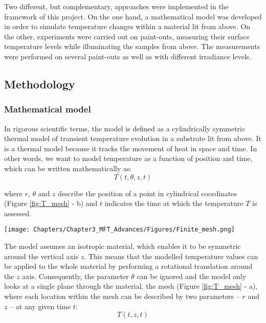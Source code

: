 Two different, but complementary, approaches were implemented in the framework of this project. On the one hand, a mathematical model was developed in order to simulate temperature changes within a material lit from above. On the other, experiments were carried out on paint-outs, measuring their surface temperature levels while illuminating the samples from above. The measurements were performed on several paint-outs as well as with different irradiance levels.\\

\newpage
\subsection{Methodology}

\subsubsection{Mathematical model}

In rigorous scientific terms, the model is defined as a cylindrically symmetric thermal model of transient temperature evolution in a substrate lit from above. It is a thermal model because it tracks the movement of heat in space and time. In other words, we want to model temperature as a function of position and time, which can be written mathematically as: 
$$ T(t,\theta,z,t) $$              

where $r$, $\theta$ and $z$ describe the position of a point in cylindrical coordinates (Figure \ref{fig:T_mesh} - b) and $t$ indicates the time at which the temperature $T$ is assessed. \\

\vspace{0.5cm}

\begin{figure*}[!h]
\centering
\texttt{[image: Chapters/Chapter3\_MFT\_Advances/Figures/Finite\_mesh.png]}
\caption[\hspace{0.3cm}Schematic representation of the thermal model.]{Schematic representation of the cylindrically symmetric thermal model.}
\label{fig:T_mesh}
\end{figure*}

The model assumes an isotropic material, which enables it to be symmetric around the vertical axis $z$. This means that the modelled temperature values can be applied to the whole material by performing a rotational translation around the $z$ axis. Consequently, the parameter $\theta$ can be ignored and the model only looks at a single plane through the material, \ie the mesh (Figure \ref{fig:T_mesh} - a), where each location within the mesh can be described by two parameters – $r$ and $z$ – at any given time $t$:
$$ T(t,z,t) $$



